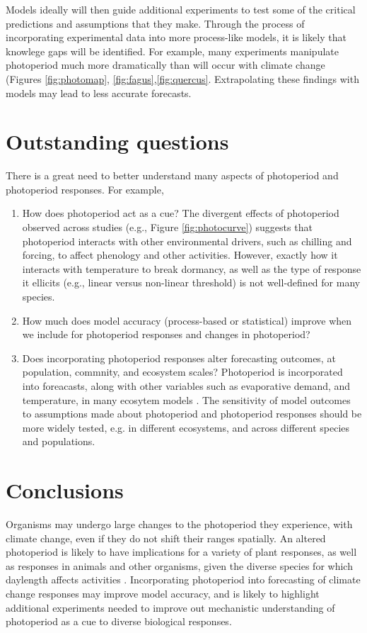 \documentclass{article}
\begin{document}
\par Models ideally will then guide additional experiments to test some of the critical predictions and assumptions that they make. Through the process of incorporating experimental data into more process-like models, it is likely that knowlege gaps will be identified. For example, many experiments manipulate photoperiod much more dramatically than will occur with climate change (Figures \ref{fig:photomap}, \ref{fig:fagus},\ref{fig:quercus}. Extrapolating these findings with models may lead to less accurate forecasts. 

\section* {Outstanding questions}
There is a great need to better understand many aspects of photoperiod and photoperiod responses. For example,
\begin{enumerate}
\item How does photoperiod act as a cue? The divergent effects of photoperiod observed across studies (e.g., Figure \ref{fig:photocurve}) suggests that photoperiod interacts with other environmental drivers, such as chilling and forcing, to affect phenology and other activities. However, exactly how it interacts with temperature to break dormancy, as well as the type of response it ellicits (e.g., linear versus non-linear threshold) is not well-defined for many species.  

\item How much does model accuracy (process-based or statistical) improve when we include for photoperiod responses and changes in photoperiod?  
\item Does incorporating photoperiod responses alter forecasting outcomes, at population, commnity, and ecosystem scales?  Photoperiod is incorporated into foreacasts, along with other variables such as evaporative demand, and temperature, in many ecosytem models \citep [e.g. ED] []{jolly2005, medvigy2013}. The sensitivity of model outcomes to assumptions made about photoperiod and photoperiod responses should be more widely tested, e.g. in different ecosystems, and across different species and populations.
\end{enumerate}


\section*{Conclusions}
Organisms may undergo large changes to the photoperiod they experience, with climate change, even if they do not shift their ranges spatially. An altered photoperiod is likely to have implications for a variety of plant responses, as well as responses in animals and other organisms, given the diverse species for which daylength affects activities \citep[e.g.,][] {taranger2003,bradshaw2006,mcallan2006,linn1996,Flynn:2018,solbakken1994}. Incorporating photoperiod into forecasting of climate change responses may improve model accuracy, and is likely to highlight additional experiments needed to improve out mechanistic understanding of photoperiod as a cue to diverse biological responses. 
\end{document}
